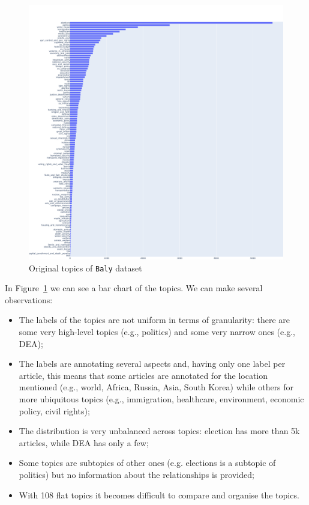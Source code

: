 \begin{figure}[!htbp]
    \centering
    \includegraphics[width=\linewidth]{figures/baly_original_topics.pdf}
    \caption{Original topics of \texttt{Baly} dataset}
    \label{fig:baly_original_topics}
\end{figure}

In Figure~\ref{fig:baly_original_topics} we can see a bar chart of the topics. We can make several observations:

\begin{itemize}
    \item The labels of the topics are not uniform in terms of granularity: there are some very high-level topics (e.g., politics) and some very narrow ones (e.g., DEA);
    \item The labels are annotating several aspects and, having only one label per article, this means that some articles are annotated for the location mentioned (e.g., world, Africa, Russia, Asia, South Korea) while others for more ubiquitous topics (e.g., immigration, healthcare, environment, economic policy, civil rights); %
    \item The distribution is very unbalanced across topics: election has more than 5k articles, while DEA has only a few;
    \item Some topics are subtopics of other ones (e.g. elections is a subtopic of politics) but no information about the relationships is provided;
    \item With 108 flat topics it becomes difficult to compare and organise the topics.
\end{itemize}

